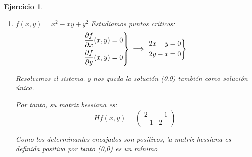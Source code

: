 \documentclass[11pt, a4paper, titlepage]{article}
\theoremstyle{exercise-style}
\newtheorem*{ejer}{Ejercicio}
\theoremstyle{theorem-style}
\newenvironment{rcases}
  {\left.\begin{aligned}}
  {\end{aligned}\right\rbrace}
\begin{document}
\begin{ejer}
\begin{enumerate}
	Y esta matriz no es ni semidefinida positiva ni semidefinida negativa. Por tanto, en este caso el (0,0) no es ni máximo ni mínimo relativo.
	Como no es ni máximo ni crítico pero su derivada es cero, se denomina punto de silla.
	
	\item $f(x,y)=x^2-xy+y^2$ Estudiamos puntos críticos:
	\[
	\begin{rcases}
	\frac{\partial f}{\partial x}(x,y) = 0\\
	\frac{\partial f}{\partial y}(x,y) = 0
\end{rcases} \implies \begin{rcases}
	2x -y= 0\\
	2y-x = 0\\
\end{rcases}
	\]
	
	Resolvemos el sistema, y nos queda la solución (0,0) también como solución única.
	
	Por tanto, su matriz hessiana es:
		\[
	Hf(x,y) = \begin{pmatrix} 2 & -1 \\ -1 & 2 \end{pmatrix} 
	\]
	
	Como los determinantes encajados son positivos, la matriz hessiana es definida positiva por tanto (0,0) es un mínimo
	
	
\end{enumerate}
\end{ejer}
\end{document}
